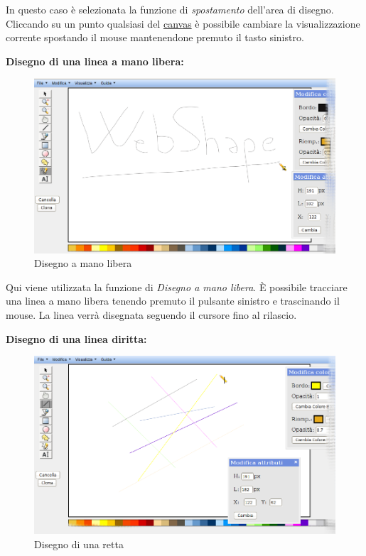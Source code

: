 \vspace{50pt}
In questo caso \`e selezionata la funzione di \textit{spostamento} dell'area di disegno. Cliccando su un punto qualsiasi del \underline{canvas} \`e possibile cambiare la visualizzazione corrente spostando il mouse mantenendone premuto il tasto sinistro.
\newpage

\textbf{Disegno di una linea a mano libera:}\\
\begin{figure}[!ht]
\centering
\includegraphics[scale=0.5]{images/matita.png}
\caption{Disegno a mano libera}
\end{figure}
 
\vspace{100pt}
Qui viene utilizzata la funzione di \textit{Disegno a mano libera}. \`E possibile tracciare una linea a mano libera tenendo premuto il pulsante sinistro e trascinando il mouse. La linea verr\` a disegnata seguendo il cursore fino al rilascio.
\newpage

\textbf{Disegno di una linea diritta:}\\ 
\begin{figure}[!ht]
\centering
\includegraphics[scale=0.5]{images/linea.png}
\caption{Disegno di una retta}
\end{figure}

